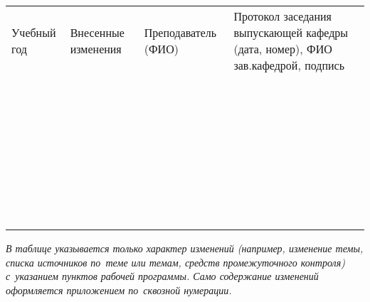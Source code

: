 \documentclass[a4paper,12pt]{article}
\begin{document}
  \noindent
  \begin{tabular}{|p{15mm}|p{67mm}|p{25mm}|p{41mm}|}
    \hline
    \small\centering
    Учебный год 
    & \small\centering
    Внесенные изменения 
    & \small\centering
    Преподаватель (ФИО) 
    & \small\centering\arraybackslash
    Протокол заседания выпускающей кафедры (дата, номер), ФИО зав.кафедрой, подпись \\
    & & & \\\hline
    & & & \\\hline
    & & & \\\hline
    & & & \\\hline
    & & & \\\hline
    & & & \\\hline
    & & & \\\hline
    & & & \\\hline
    & & & \\\hline
    & & & \\\hline
    & & & \\\hline
    & & & \\\hline
    & & & \\\hline
    & & & \\\hline
    & & & \\\hline
    & & & \\\hline
    & & & \\\hline
    & & & \\\hline
    & & & \\\hline
    & & & \\\hline
    & & & \\\hline
    & & & \\\hline
    & & & \\\hline
    & & & \\\hline
    & & & \\\hline
    & & & \\\hline
    & & & \\\hline
    & & & \\\hline
    & & & \\\hline
    & & & \\\hline
    & & & \\\hline
    & & & \\\hline
    & & & \\\hline
    & & & \\\hline
    & & & \\\hline
    & & & \\\hline
  \end{tabular}

  \medskip\noindent\textit{В таблице указывается только характер изменений (например, изменение темы, списка источников по~теме или темам, средств промежуточного контроля) с~указанием пунктов рабочей программы. Само содержание изменений оформляется приложением по~сквозной нумерации.}

\newpage\tableofcontents
\end{document}
